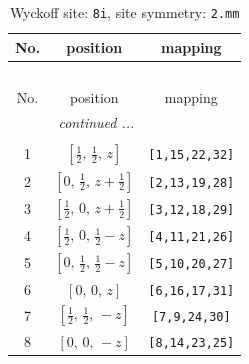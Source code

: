 \documentclass[fleqn,8pt]{jsarticle}
\begin{document}
\begin{longtable}{ccc}
\caption{Wyckoff site: {\tt 8i}, site symmetry: {\tt 2.mm}}
 \\
 \hline \hline
No. & position & mapping \\ \hline \endfirsthead

\multicolumn{2}{l}{\tablename\ \thetable{}} \\
 \hline \hline
No. & position & mapping \\ \hline \endhead

 \hline \hline
\multicolumn{2}{r}{\footnotesize\it continued ...} \\ \endfoot

 \hline \hline
\multicolumn{2}{r}{} \\ \endlastfoot

1 & $\left[ \frac{1}{2},\, \frac{1}{2},\, z \right]$ & {\tt [1,15,22,32]} \\ \hline
2 & $\left[ 0,\, \frac{1}{2},\, z + \frac{1}{2} \right]$ & {\tt [2,13,19,28]} \\ \hline
3 & $\left[ \frac{1}{2},\, 0,\, z + \frac{1}{2} \right]$ & {\tt [3,12,18,29]} \\ \hline
4 & $\left[ \frac{1}{2},\, 0,\, \frac{1}{2} - z \right]$ & {\tt [4,11,21,26]} \\ \hline
5 & $\left[ 0,\, \frac{1}{2},\, \frac{1}{2} - z \right]$ & {\tt [5,10,20,27]} \\ \hline
6 & $\left[ 0,\, 0,\, z \right]$ & {\tt [6,16,17,31]} \\ \hline
7 & $\left[ \frac{1}{2},\, \frac{1}{2},\, - z \right]$ & {\tt [7,9,24,30]} \\ \hline
8 & $\left[ 0,\, 0,\, - z \right]$ & {\tt [8,14,23,25]} \\
\end{longtable}
\renewcommand{\arraystretch}{1.2}
\end{document}
